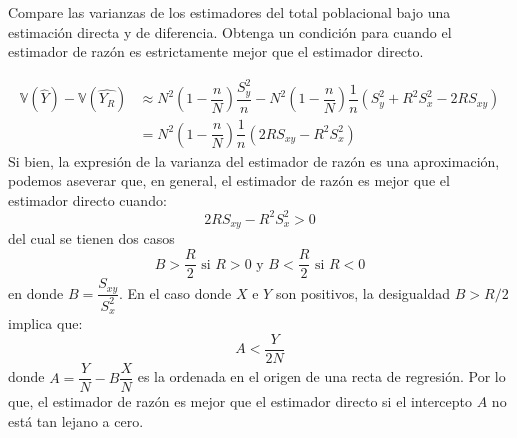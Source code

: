 \addpoints
\question[10] Compare las varianzas de los estimadores del total poblacional bajo una estimación directa y de diferencia. Obtenga un condición para cuando el estimador de razón es estrictamente mejor que el estimador directo.
\begin{solution}
\begin{align*}
\mathbb{V}(\widehat{Y})-\mathbb{V}(\widehat{Y_R})&\approx N^2\left(1-\dfrac{n}{N}\right)\dfrac{S_{y}^2}{n}-N^2\left(1-\dfrac{n}{N}\right)\dfrac{1}{n}\left(S_{y}^2+R^2 S_{x}^{2}-2R S_{xy}\right)\\
&=N^2\left(1-\dfrac{n}{N}\right)\dfrac{1}{n}\left(2RS_{xy}-R^2S_{x}^2\right)
\end{align*}
Si bien, la expresión de la varianza del estimador de razón es una aproximación, podemos aseverar que, en general, el estimador de razón es mejor que el estimador directo cuando:
$$2RS_{xy}-R^2S_{x}^2>0$$
del cual se tienen dos casos
$$B> \dfrac{R}{2} \text{ si }R>0 \text{ y } B< \dfrac{R}{2} \text{ si } R<0$$
en donde $B=\dfrac{S_{xy}}{S_{x}^2}$. En el caso donde $X$ e $Y$ son positivos, la desigualdad $B>R/2$ implica que:
$$A<\dfrac{Y}{2N}$$
donde $A=\dfrac{Y}{N}-B\dfrac{X}{N}$ es la ordenada en el origen de una recta de regresión. Por lo que, el estimador de razón es mejor que el estimador directo si el intercepto $A$ no está tan lejano a cero.
\end{solution}